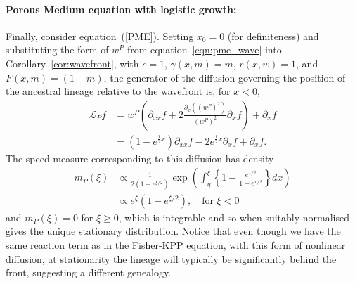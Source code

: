 \documentclass[EJP]{ejpecp} %
\newcommand{\Lgen}{\mathcal{L}}    %
\begin{document}
\paragraph{Porous Medium equation with logistic growth:}
Finally, consider equation~(\ref{PME}). Setting $x_0=0$ (for definiteness) and substituting
the form of $w^P$ from equation~\eqref{eqn:pme_wave}
into Corollary~\ref{cor:wavefront},
with $c=1$,
$\gamma(x, m) = m$,
$r(x,w) = 1$,
and $F(x, m) = (1 - m)$,
the generator of the diffusion governing the position of the ancestral lineage relative to the wavefront
is, for $x < 0$,
\begin{align*}
    \Lgen_P f
    &=
        w^P
        \left(
        \partial_{xx} f
         +
         2 \frac{\partial_x((w^P)^2)}{(w^P)^2} \partial_xf
        \right)
        + \partial_xf \\
    &=
        \left(1 - e^{\frac{1}{2} x} \right)
        \partial_{xx}f
        -
        2 e^{\frac{1}{2} x} \partial_xf
        +
        \partial_xf .
\end{align*}
The speed measure corresponding to this diffusion has density
\begin{align*}
    m_P(\xi)
    &\propto
        \frac{ 1 }{ 2 (1 - e^{\xi/2}) }
        \exp\left(
            \int_\eta^\xi \left\{
                1 - \frac{e^{x/2}}{1 - e^{x/2}}
            \right\} dx
        \right) \\
    &\propto
        e^\xi\left(1-e^{\xi/2}\right),
        \quad
        \text{for } \xi < 0 
\end{align*}
and $m_P(\xi) = 0$ for $\xi \ge 0$,
which is integrable and so when suitably normalised gives the unique stationary distribution.
Notice that even though we have the same reaction term as in the Fisher-KPP equation, with this 
form of nonlinear diffusion, at stationarity
the lineage will typically be significantly behind the front, 
suggesting a different genealogy. 
\end{document}
